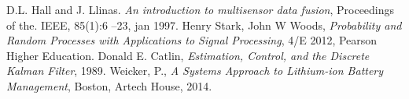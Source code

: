 \begin{thebibliography}{99}
	D.L. Hall and J. Llinas. \emph{An introduction to multisensor data fusion}, Proceedings of the. IEEE, 85(1):6 –23, jan 1997.
	Henry Stark, John W Woods, \emph{Probability and Random Processes with Applications to Signal Processing}, 4/E 2012,
	 Pearson Higher Education.
	Donald E. Catlin, \emph{Estimation, Control, and the Discrete Kalman Filter}, 1989.
	Weicker, P., \emph{A Systems Approach to Lithium-ion Battery Management}, Boston, Artech House, 2014.
\end{thebibliography}
